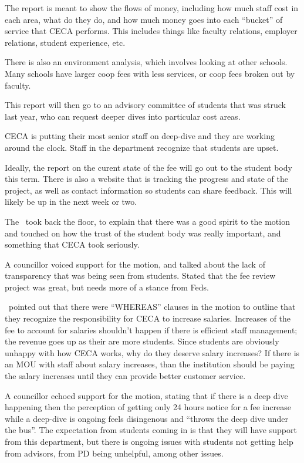 \begin{motion}
    The report is meant to show the flows of money, including how much staff
    cost in each area, what do they do, and how much money goes into each
    ``bucket'' of service that CECA performs. This includes things like
    faculty relations, employer relations, student experience, etc. 

    There is also an environment analysis, which involves looking at other
    schools. Many schools have larger coop fees with less services, or coop
    fees broken out by faculty. 

    This report will then go to an advisory committee of students that was
    struck last year, who can request deeper dives into particular cost areas. 

    CECA is putting their most senior staff on deep-dive and they are working
    around the clock. Staff in the department recognize that students are
    upset.   

    Ideally, the report on the curent state of the fee will go out to the
    student body this term. There is also a website that is tracking the
    progress and state of the project, as well as contact information so
    students can share feedback. This will likely be up in the next week or
    two.

    The \andrewc\ took back the floor, to explain that there was a good spirit 
    to the motion and touched on how the trust of the student body was really 
    important, and something that CECA took seriously. 

    A councillor voiced support for the motion, and talked about the 
    lack of transparency that was being seen from students. Stated that the 
    fee review project was great, but needs more of a stance from Feds. 

    \seneca\ pointed out that there were ``WHEREAS'' clauses in the motion to
    outline that they recognize the responsibility for CECA to increase
    salaries. Increases of the fee to account for salaries shouldn't happen
    if there is efficient staff management; the revenue goes up as their are 
    more students. Since students are obviously unhappy with how CECA works, why
    do they deserve salary increases? If there is an MOU with staff about 
    salary increases, than the institution should be paying the salary
    increases until they can provide better customer service. 

    A councillor echoed support for the motion, stating that if there is a deep
    dive happening then the perception of getting only 24 hours notice for a
    fee increase while a deep-dive is ongoing feels disingenous and ``throws
    the deep dive under the bus''. The expectation from students coming in is
    that they will have support from this department, but there is ongoing
    issues with students not getting help from advisors, from PD being
    unhelpful, among other issues.


\end{motion}
